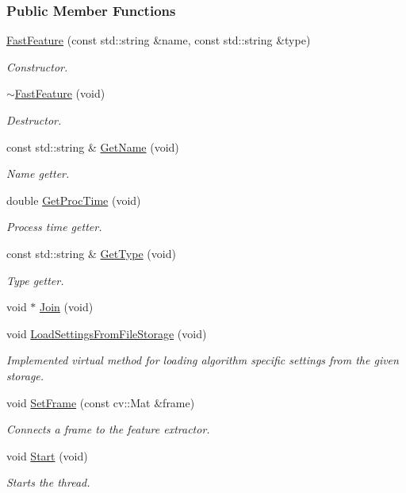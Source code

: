 \subsubsection*{Public Member Functions}
\begin{DoxyCompactItemize}
\item 
\hyperlink{group___feature_extractor_a5e30312c922a9006209e601475c3cd11}{Fast\-Feature} (const std\-::string \&name, const std\-::string \&type)
\begin{DoxyCompactList}\small\item\em Constructor. \end{DoxyCompactList}\item 
\hyperlink{group___feature_extractor_a32a012aa9fef7fdf88d062421d76ab35}{$\sim$\-Fast\-Feature} (void)
\begin{DoxyCompactList}\small\item\em Destructor. \end{DoxyCompactList}\item 
const std\-::string \& \hyperlink{group___feature_extractor_a5f69ca2455d5eec4493dbf115d00d5c9}{Get\-Name} (void)
\begin{DoxyCompactList}\small\item\em Name getter. \end{DoxyCompactList}\item 
double \hyperlink{group___feature_extractor_ad07a3104192b50d911eee634a0be009d}{Get\-Proc\-Time} (void)
\begin{DoxyCompactList}\small\item\em Process time getter. \end{DoxyCompactList}\item 
const std\-::string \& \hyperlink{group___feature_extractor_a6724c19006d495bd6a9c8c6029236ebc}{Get\-Type} (void)
\begin{DoxyCompactList}\small\item\em Type getter. \end{DoxyCompactList}\item 
void $\ast$ \hyperlink{group___core_a8f33f7750321d5df9188033e7e3e300d}{Join} (void)
\item 
void \hyperlink{group___feature_extractor_a341ffc5bd43e0ee09fda3fe6f825acba}{Load\-Settings\-From\-File\-Storage} (void)
\begin{DoxyCompactList}\small\item\em Implemented virtual method for loading algorithm specific settings from the given storage. \end{DoxyCompactList}\item 
void \hyperlink{group___feature_extractor_a3c58d995fb2440b28db3b21b54b94815}{Set\-Frame} (const cv\-::\-Mat \&frame)
\begin{DoxyCompactList}\small\item\em Connects a frame to the feature extractor. \end{DoxyCompactList}\item 
void \hyperlink{group___core_a2b42f82341afd2747ea093b6ac8b91cb}{Start} (void)
\begin{DoxyCompactList}\small\item\em Starts the thread. \end{DoxyCompactList}\end{DoxyCompactItemize}
